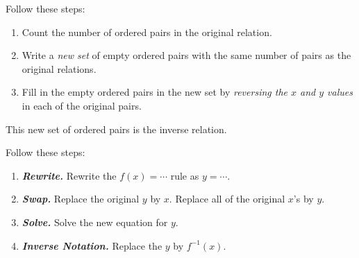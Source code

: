\documentclass[fleqn,letterpaper,12pt,printwatermark=false]{memoir}
\begin{document}
\begin{myKeyConcepts}
    Follow these steps:
    \begin{enumerate}
        \item Count the number of ordered pairs in the original relation.
        \item Write a \emph{new set} of empty ordered pairs with the 
        same number of pairs as the original relations.
        \item Fill in the empty ordered pairs in the new set
        by \emph{reversing the $x$ and $y$ values} in each of the
        original pairs.
    \end{enumerate}
    This new set of ordered pairs is the inverse relation.
\end{myKeyConcepts}



\begin{myKeyConcepts}
    Follow these steps:
    \begin{enumerate}
        \item {\bfseries\itshape Rewrite.}
        Rewrite the $f(x) = \cdots$ rule as $y=\cdots$.
        \item {\bfseries\itshape Swap.}
        Replace the original $y$ by $x$.
        Replace all of the original $x$'s by $y$.
        \item {\bfseries\itshape Solve.}
        Solve the new equation for $y$.
        \item {\bfseries\itshape Inverse Notation.}
        Replace the $y$ by $f^{-1}(x)$.
    \end{enumerate}
\end{myKeyConcepts}






  
\end{document}
